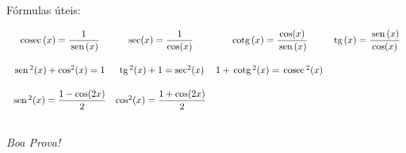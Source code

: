 \documentclass[a4paper,5pt]{amsbook}
\newcommand{\sen}{\,\mbox{sen}\,}
\newcommand{\tg}{\,\mbox{tg}\,}
\newcommand{\cosec}{\,\mbox{cosec}\,}
\newcommand{\cotg}{\,\mbox{cotg}\,}
\newcommand{\ds}{\displaystyle}
\begin{document}
F\'ormulas \'uteis:

\[\begin{array}{cccc}
	\vspace{0.5cm}
	\cosec(x) = \displaystyle\frac{1}{\sen(x)} & \sec(x) = \displaystyle\frac{1}{\cos(x)} & \cotg(x) = \displaystyle\frac{\cos(x)}{\sen(x)} & \ds\tg(x) = \frac{\sen(x)}{\cos(x)}\\
	\vspace{0.5cm}
	\sen^2(x) + \cos^2(x) = 1 & \tg^2(x) + 1 = \sec^2(x) & 1 + \cotg^2(x) = \cosec^2(x) & \\
	\vspace{0.5cm}
	\sen^2(x) = \displaystyle\frac{1 - \cos(2x)}{2} & \cos^2(x) = \displaystyle\frac{1 + \cos(2x)}{2} & & 
\end{array}\]

\begin{flushright}
	\textit{Boa Prova!}
\end{flushright}
\end{document}

